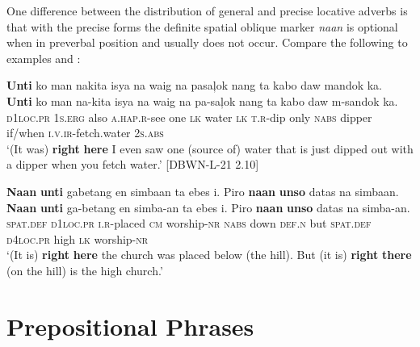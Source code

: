 One difference between the distribution of general and precise locative adverbs is that with the precise forms the definite spatial oblique marker \textit{naan} is optional when in preverbal position and usually does not occur. Compare the following to examples  and :

\ea
\textbf{Unti}  ko  man  nakita  isya  na  waig  na  pasaļok  nang  ta kabo  daw  mandok  ka. \\\smallskip
 \gll \textbf{Unti}  ko  man  na-kita  isya  na  waig  na  pa-saļok  nang  ta kabo  daw  m-sandok  ka. \\
\textsc{d1loc.pr}  1\textsc{s.erg}  also  \textsc{a.hap.r}-see  one  \textsc{lk}  water  \textsc{lk}  \textsc{t.r}-dip  only  \textsc{nabs} dipper  if/when  \textsc{i.v.ir}-fetch.water  2\textsc{s.abs} \\
\glt `(It was) \textbf{right} \textbf{here} I even saw one (source of) water that is just dipped out with a dipper when you fetch water.' [DBWN-L-21 2.10]
\z

\ea
\textbf{Naan}  \textbf{unti}  gabetang  en  simbaan  ta  ebes  i.  Piro \textbf{naan}  \textbf{unso}  datas  na  simbaan. \\\smallskip
 \gll \textbf{Naan}  \textbf{unti}  ga-betang  en  simba-an  ta  ebes  i.  Piro \textbf{naan}  \textbf{unso}  datas  na  simba-an. \\
\textsc{spat.def}  \textsc{d}1\textsc{loc.pr}  \textsc{i.r}-placed  \textsc{cm}  worship-\textsc{nr}  \textsc{nabs}  down  \textsc{def.n}  but
\textsc{spat.def}  \textsc{d}4\textsc{loc.pr}  high  \textsc{lk}  worship-\textsc{nr} \\
\glt `(It is) \textbf{right} \textbf{here} the church was placed below (the hill). But (it is) \textbf{right} \textbf{there} (on the hill) is the high church.’
\z

\section{Prepositional Phrases}
\label{bkm:Ref481473714} 


